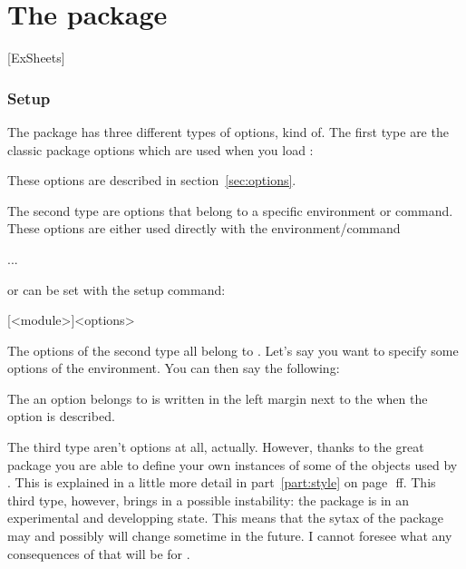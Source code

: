 \documentclass[DIV10,toc=index,toc=bib,numbers=noendperiod]{cnpkgdoc}
\begin{document}
\part{The \ExSheets package}\label{part:exsheets}\secidx{\ExSheets}[ExSheets]
\section{Setup}
The \ExSheets package has three different types of options, kind of.  The
first type are the classic package options which are used when you load
\ExSheets:
\begin{beispiel}
 \usepackage[<options>]{exsheets}
\end{beispiel}
These options are described in section~\ref{sec:options}.

The second type are options that belong to a specific environment or command.
These options are either used directly with the environment/command
\begin{beispiel}
 \begin{env}[<options>]
  ...
 \end{env}
\end{beispiel}
or can be set with the setup command:
\begin{beschreibung}
 [<module>]{<options>}
\end{beschreibung}
The options of the second type all belong to
\textcolor{module}{}.  Let's say you want to specify some
options of the  environment.  You can then say the following:
\begin{beispiel}
\end{beispiel}
The \textcolor{module}{} an option belongs to is written in the
left margin next to the when the option is described.

The third type aren't options at all, actually.  However, thanks to the great
 package you are able to define your own instances of some of
the objects used by \ExSheets.  This is explained in a little more detail in
part~\ref{part:style} on page~\pageref{part:style}\,ff.  This third type,
however, brings in a possible instability: the  package is in
an experimental and developping state.  This means that the sytax of the
package may and possibly will change sometime in the future.  I cannot foresee
what any consequences of that will be for \ExSheets.
\end{document}
